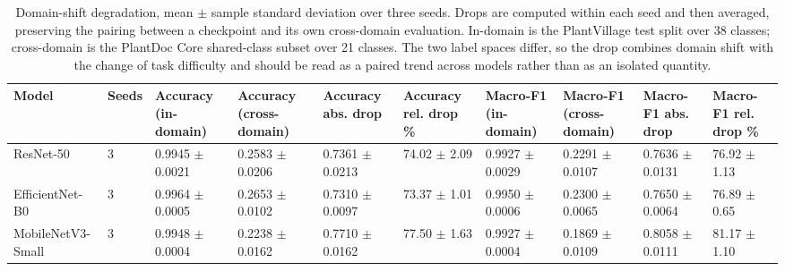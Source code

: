 \begin{table}
\caption{Domain-shift degradation, mean $\pm$ sample standard deviation over three seeds. Drops are computed within each seed and then averaged, preserving the pairing between a checkpoint and its own cross-domain evaluation. In-domain is the PlantVillage test split over 38 classes; cross-domain is the PlantDoc Core shared-class subset over 21 classes. The two label spaces differ, so the drop combines domain shift with the change of task difficulty and should be read as a paired trend across models rather than as an isolated quantity.}
\label{tab:degradation}
\scriptsize
\centering
\setlength{\tabcolsep}{2pt}
\begin{tabular}{llllllllll}
\toprule
Model & Seeds & Accuracy (in-domain) & Accuracy (cross-domain) & Accuracy abs. drop & Accuracy rel. drop \% & Macro-F1 (in-domain) & Macro-F1 (cross-domain) & Macro-F1 abs. drop & Macro-F1 rel. drop \% \\
\midrule
ResNet-50 & 3 & 0.9945 $\pm$ 0.0021 & 0.2583 $\pm$ 0.0206 & 0.7361 $\pm$ 0.0213 & 74.02 $\pm$ 2.09 & 0.9927 $\pm$ 0.0029 & 0.2291 $\pm$ 0.0107 & 0.7636 $\pm$ 0.0131 & 76.92 $\pm$ 1.13 \\
EfficientNet-B0 & 3 & 0.9964 $\pm$ 0.0005 & 0.2653 $\pm$ 0.0102 & 0.7310 $\pm$ 0.0097 & 73.37 $\pm$ 1.01 & 0.9950 $\pm$ 0.0006 & 0.2300 $\pm$ 0.0065 & 0.7650 $\pm$ 0.0064 & 76.89 $\pm$ 0.65 \\
MobileNetV3-Small & 3 & 0.9948 $\pm$ 0.0004 & 0.2238 $\pm$ 0.0162 & 0.7710 $\pm$ 0.0162 & 77.50 $\pm$ 1.63 & 0.9927 $\pm$ 0.0004 & 0.1869 $\pm$ 0.0109 & 0.8058 $\pm$ 0.0111 & 81.17 $\pm$ 1.10 \\
\bottomrule
\end{tabular}
\end{table}
